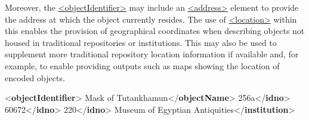 Moreover, the \hyperref[TEI.objectIdentifier]{<objectIdentifier>} may include an \hyperref[TEI.address]{<address>} element to provide the address at which the object currently resides. The use of \hyperref[TEI.location]{<location>} within this enables the provision of geographical coordinates when describing objects not housed in traditional repositories or institutions. This may also be used to supplement more traditional repository location information if available and, for example, to enable providing outputs such as maps showing the location of encoded objects. \par\bgroup{}\exampleFont \begin{shaded}\noindent\mbox{}{<\textbf{objectIdentifier}>}\mbox{}\newline 
{}Mask of Tutankhamun{</\textbf{objectName}>}\mbox{}\newline 
{}256a{</\textbf{idno}>}\mbox{}\newline 
{}60672{</\textbf{idno}>}\mbox{}\newline 
{}220{</\textbf{idno}>}\mbox{}\newline 
{}Museum of Egyptian Antiquities{</\textbf{institution}>}\mbox{}\newline 
{}\mbox{}\newline 

\end{shaded}
